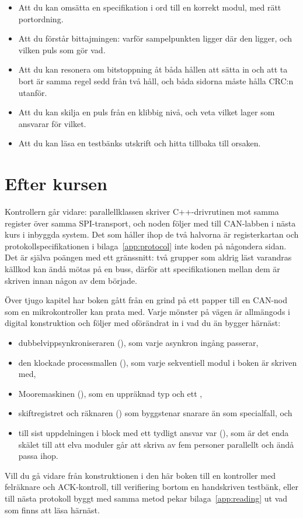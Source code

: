 \begin{itemize}
  \item Att du kan omsätta en specifikation i ord till en korrekt modul, med rätt portordning.
  \item Att du förstår bittajmingen: varför sampelpunkten ligger där den ligger, och vilken puls som
    gör vad.
  \item Att du kan resonera om bitstoppning åt båda hållen \textemdash{} att sätta in och att ta
    bort är samma regel sedd från två håll, och båda sidorna måste hålla CRC:n utanför.
  \item Att du kan skilja en puls från en klibbig nivå, och veta vilket lager som ansvarar för
    vilket.
  \item Att du kan läsa en testbänks utskrift och hitta tillbaka till orsaken.
\end{itemize}

\section{Efter kursen}
\label{c20:sec:after}

Kontrollern går vidare: parallellklassen skriver C++-drivrutinen mot samma register över samma
SPI-transport, och noden följer med till CAN-labben i nästa kurs i inbyggda system. Det som håller
ihop de två halvorna är registerkartan och protokollspecifikationen i bilaga~\ref{app:protocol}
\textemdash{} inte koden på någondera sidan. Det är själva poängen med ett gränssnitt: två grupper
som aldrig läst varandras källkod kan ändå mötas på en buss, därför att specifikationen mellan dem är
skriven innan någon av dem började.

Över tjugo kapitel har boken gått från en grind på ett papper till en CAN-nod som en mikrokontroller
kan prata med. Varje mönster på vägen är allmängods i digital konstruktion och följer med oförändrat
in i vad du än bygger härnäst:

\begin{itemize}
  \item dubbelvippsynkroniseraren (), som varje asynkron ingång passerar,
  \item den klockade processmallen (), som varje sekventiell modul i boken är skriven
    med,
  \item Mooremaskinen (), som en uppräknad typ och ett ,
  \item skiftregistret och räknaren () som byggstenar snarare än som specialfall, och
  \item till sist uppdelningen i block med ett tydligt ansvar var (), som är det enda
    skälet till att elva moduler går att skriva av fem personer parallellt och ändå passa ihop.
\end{itemize}

Vill du gå vidare från konstruktionen i den här boken \textemdash{} till en kontroller med felräknare
och ACK-kontroll, till verifiering bortom en handskriven testbänk, eller till nästa protokoll byggt
med samma metod \textemdash{} pekar bilaga~\ref{app:reading} ut vad som finns att läsa härnäst.
